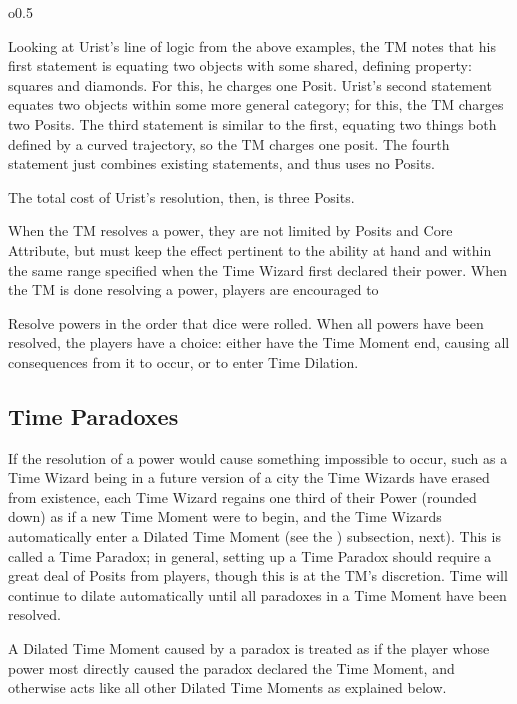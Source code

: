 \documentclass[twoside]{article}
\newenvironment{examplebox}[1]{\begin{tcolorbox}[colback=green!5!white,colframe=green!75!black,title={Example: #1}]}{\end{tcolorbox}\vspace{-30pt}}
\begin{document}
\begin{wrapfigure}{o}{0.5\textwidth}
   \begin{examplebox}{Posit Costs}
      Looking at Urist's line of logic from the above examples, the TM notes that his first
      statement is equating two objects with some shared, defining property: squares and
      diamonds. For this, he charges one Posit. Urist's second statement equates two objects
      within some more general category; for this, the TM charges two Posits. The third
      statement is similar to the first, equating two things both defined by a curved trajectory,
      so the TM charges one posit. The fourth statement just combines existing statements, and
      thus uses no Posits.

      The total cost of Urist's resolution, then, is three Posits.
   \end{examplebox}
\end{wrapfigure}

When the TM resolves a power, they are not limited by Posits and Core Attribute, but must keep
the effect pertinent to the ability at hand and within the same range specified when the Time
Wizard first declared their power. When the TM is done resolving a power, players are encouraged
to 

Resolve powers in the order that dice were rolled. When all powers have been resolved, the
players have a choice: either have the Time Moment end, causing all consequences from it to
occur, or to enter Time Dilation.

\subsection{Time Paradoxes} \label{ssec:time-paradox}
If the resolution of a power would cause something impossible to occur, such as a Time Wizard
being in a future version of a city the Time Wizards have erased from existence, each Time
Wizard regains one third of their Power (rounded down) as if a new Time Moment were to begin,
and the Time Wizards automatically enter a Dilated Time Moment (see the
) subsection, next). This is called a Time Paradox; in general,
setting up a Time Paradox should require a great deal of Posits from players, though this is at
the TM's discretion. Time will continue to dilate automatically until all paradoxes in a Time
Moment have been resolved.

A Dilated Time Moment caused by a paradox is treated as if the player whose power most directly
caused the paradox declared the Time Moment, and otherwise acts like all other Dilated Time
Moments as explained below.
\end{document}
